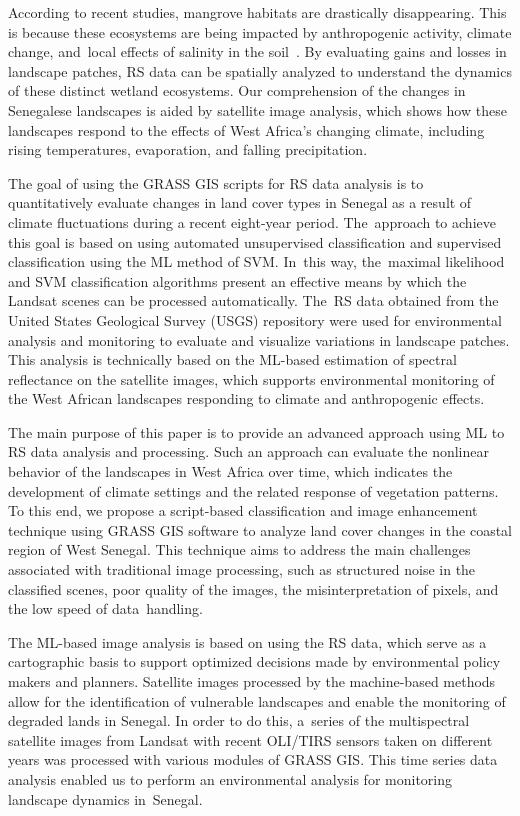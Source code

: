 \documentclass[earth,article,accept,pdftex,moreauthors]{Definitions/mdpi}
\begin{document}
{According to} recent studies, mangrove {habitats} are {drastically disappearing. {This is because }these} ecosystems are{ }{being impacted by} anthropogenic {activity}, climate change, and~local effects of salinity in {the} soil~\cite{ANDRIEU2020117963,Devaney}. {By evaluating gains and losses in landscape} patches, {RS} data {can be spatially analyzed} to{ }understand the dynamics of these {distinct} wetland ecosystems. {Our comprehension of the changes} in Senegalese landscapes {is aided by} satellite image analysis, {which{ }shows how these} landscapes {respond} to the effects of West Africa's changing climate, {including rising} temperatures{, }evaporation, and {falling} precipitation. 

The goal of using the GRASS GIS scripts for {RS} data analysis is to quantitatively evaluate changes in land cover types in Senegal {as a result of} climate fluctuations {during} a recent eight-year period{. The~approach to achieve this goal is based on }using automated unsupervised classification and supervised classification using the ML method of {SVM}. In~this way, the~maximal likelihood {and SVM }classification {algorithms present} an effective means by which the{ }Landsat scenes can be processed automatically. The~{RS} data obtained from the {United States Geological Survey (}USGS) repository {were} used for {environmental }analysis and{ }monitoring to {evaluate and visualize} variations in landscape patches{. This analysis {is }technically based on the ML-based estimation of spectral reflectance on the satellite images{, which} supports environmental monitoring of the West African landscapes} responding to climate and anthropogenic effects{.} 

The main purpose of this paper is to provide an advanced approach using {ML} to {RS} data analysis and processing{. Such an approach }can {evaluate} the nonlinear behavior of {the }landscapes in West Africa over time{, which indicates} the development of climate settings and{ }the related response of vegetation patterns. {To this end, we} propose a script-based classification and image enhancement technique {using}{ }GRASS GIS{ software} to {analyze} land cover changes in the coastal region of West Senegal. {This} technique {aims} to address the main {challenges associated with} traditional image processing, {such as }structured noise in {the }classified scenes, poor quality {of the} images{, the} misinterpretation of pixels, {and the} low speed of data~handling. 

{The ML-based image analysis is based on using the }{RS} data, {which serve} as a cartographic basis to support optimized decisions made {by} environmental policy makers and planners{. Satellite images processed by the machine-based methods allow for }the identification of vulnerable landscapes and {enable} the monitoring of degraded lands in Senegal. {In order to do this}, a~series of the multispectral satellite images from Landsat with recent OLI/TIRS sensors {taken on different years} was processed with various modules of GRASS GIS{. This time series data analysis{ }enabled us to perform {an }environmental } analysis for monitoring landscape dynamics in~Senegal. 
\end{document}
